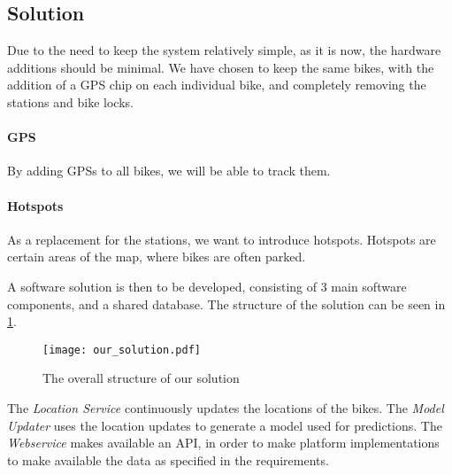 \subsection{Solution}
Due to the need to keep the system relatively simple, as it is now, the hardware additions should be minimal.
We have chosen to keep the same bikes, with the addition of a GPS chip on each individual bike, and completely removing the stations and bike locks.

\paragraph{GPS}
By adding GPSs to all bikes, we will be able to track them.

\paragraph{Hotspots}
As a replacement for the stations, we want to introduce hotspots.
Hotspots are certain areas of the map, where bikes are often parked.

A software solution is then to be developed, consisting of 3 main software components, and a shared database.
The structure of the solution can be seen in \cref{fig:solution_structure}.

\begin{figure}[h]
\texttt{[image: our\_solution.pdf]}
\caption{The overall structure of our solution}
\label{fig:solution_structure}
\end{figure}

The \textit{Location Service} continuously updates the locations of the bikes.
The \textit{Model Updater} uses the location updates to generate a model used for predictions.
The \textit{Webservice} makes available an API, in order to make platform implementations to make available the data as specified in the requirements.
